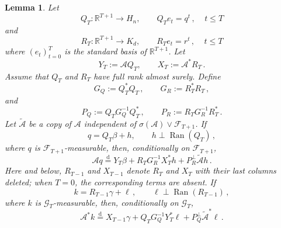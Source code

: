 \documentclass[11pt]{article}
\newtheorem{lemma}[theorem]{Lemma}
\theoremstyle{definition}
\theoremstyle{remark}
\numberwithin{equation}{section}
\numberwithin{theorem}{section}
\begin{document}
\begin{lemma}\label{lem:adaptive-conditioning}
Let
\[
  Q_T:\mathbb R^{T+1}\to H_n,
  \qquad
  Q_Te_t=q^t\,,~~~~~ t \le T 
\]
and
\[
  R_T:\mathbb R^{T+1}\to K_d,
  \qquad
  R_Te_t=r^t\,,~~~~~ t \le T
\]
where $(e_t)_{t=0}^{T}$ is the standard basis of $\mathbb R^{T+1}$.
Let
\[
  Y_T:=\mathcal A Q_T,
  \qquad
  X_T:=\mathcal A^*R_T\,.
\]
Assume that $Q_{T}$ and $R_T$ have full rank almost surely. Define
\[
  G_{Q}:=Q_T^*Q_T\,,
  \qquad
  G_{R}:=R_T^*R_T\,,
\]
and
\[
  P_{Q}:=Q_TG_{Q}^{-1}Q_T^*\,,
  \qquad
  P_{R}:=R_TG_{R}^{-1}R_T^*\,.
\] 
%
Let $\widetilde{\mathcal A}$ be a copy of $\mathcal{A}$ independent of
$\sigma(\mathcal{A}) \vee \mathscr{F}_{T+1}$. If
\[
  q=Q_T\beta+h,
  \qquad
  h\perp \operatorname{Ran}(Q_T)\,,
\]
where $q$ is $\mathscr F_{T+1}$-measurable, then, conditionally on
$\mathscr F_{T+1}$,
\begin{equation}\label{eq:adaptive-domain-vector}
  \mathcal A q
  \stackrel{\mathrm d}{=}
  Y_T\beta
  +
  R_{T}G_{R}^{-1}X_{T}^*h
  +
  P_{R}^\perp\widetilde{\mathcal A}h\,.
\end{equation}
Here and below, $R_{T-1}$ and $X_{T-1}$ denote $R_T$ and $X_T$
with their last columns deleted; when $T=0$, the corresponding terms are
absent.  If
\[
  k=R_{T-1}\gamma+\ell\,,
  \qquad
  \ell\perp \operatorname{Ran}(R_{T-1})\,,
\]
where $k$ is $\mathscr G_T$-measurable, then, conditionally on
$\mathscr G_T$,
\begin{equation}\label{eq:adaptive-range-vector}
  \mathcal A^* k
  \stackrel{\mathrm d}{=}
  X_{T-1}\gamma
  +
  Q_{T}G_{Q}^{-1}Y_{T}^*\ell
  +
  P_{Q}^\perp\widetilde{\mathcal A}^*\ell\,.
\end{equation}
\end{lemma}
\end{document}
